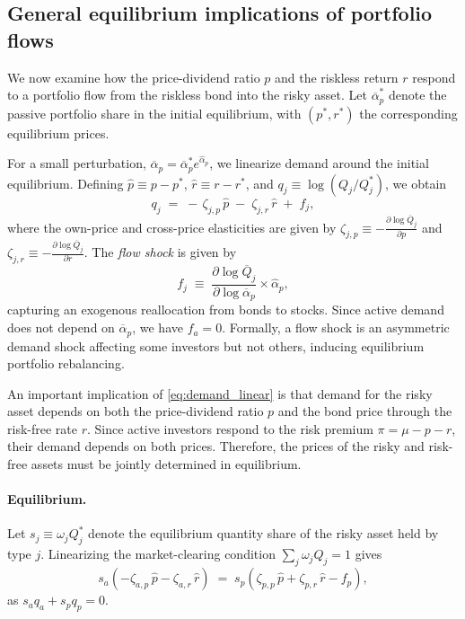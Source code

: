 \documentclass[12pt,english]{article}
\begin{document}
\subsection{General equilibrium implications of portfolio flows}

We now examine how the price-dividend ratio $p$ and the riskless return $r$ respond to a portfolio flow from the riskless bond into the risky asset.
Let $\overline{\alpha}_p^{*}$ denote the passive portfolio share in the initial equilibrium, with $(p^{*}, r^{*})$ the corresponding equilibrium prices.

For a small perturbation, $\overline{\alpha}_p = \overline{\alpha}_p^{*} e^{\hat{\alpha}_p}$, we linearize demand around the initial equilibrium.
Defining $\hat{p}\equiv p-p^{*}$, $\hat{r}\equiv r-r^{*}$, and $q_j \equiv \log(Q_j/Q_j^{*})$, we obtain
\begin{equation}\label{eq:demand_linear}
    q_j \;=\; -\,\zeta_{j,p}\,\hat{p}\;-\;\zeta_{j,r}\,\hat{r}\;+\;f_j,
\end{equation}
where the own-price and cross-price elasticities are given by $\zeta_{j,p} \equiv - \frac{\partial \log \overline{Q}_j }{\partial p}$ and $\zeta_{j,r} \equiv - \frac{\partial \log \overline{Q}_j }{\partial r}$.
The \textit{flow shock} is given by
\[
f_j \;\equiv\; \frac{\partial \log \overline{Q}_j}{\partial \log \overline{\alpha}_p} \times \hat{\alpha}_p,
\]
capturing an exogenous reallocation from bonds to stocks.
Since active demand does not depend on $\overline{\alpha}_p$, we have $f_a=0$.
Formally, a flow shock is an asymmetric demand shock affecting some investors but not others, inducing equilibrium portfolio rebalancing.

An important implication of \eqref{eq:demand_linear} is that demand for the risky asset depends on both the price-dividend ratio $p$ and the bond price through the risk-free rate $r$.
Since active investors respond to the risk premium $\pi = \mu - p - r$, their demand depends on both prices.
Therefore, the prices of the risky and risk-free assets must be jointly determined in equilibrium.


\paragraph{Equilibrium.}
Let $s_j \equiv \omega_j Q_j^{*}$ denote the equilibrium quantity share of the risky asset held by type $j$.
Linearizing the market-clearing condition $\sum_j \omega_j Q_j = 1$ gives
\begin{equation}\label{eq:risky_mkt_linear}
s_a\!\left(-\zeta_{a,p}\,\hat{p}-\zeta_{a,r}\,\hat{r}\right)
\;=\;
s_p\!\left(\zeta_{p,p}\,\hat{p}+\zeta_{p,r}\,\hat{r}-f_p\right),
\end{equation}
as $s_a q_a + s_p q_p = 0.$
\end{document}

